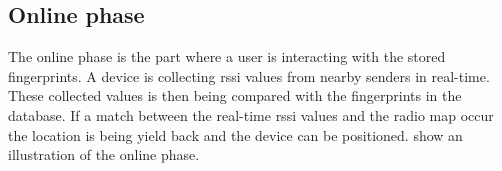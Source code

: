

\subsection{Online phase}\label{sec:theoryFingerprintOnline} The online phase
is the part where a user is interacting with the stored fingerprints.
A device is collecting \acrshort{rssi} values from nearby senders in real-time.
These collected values is then being compared with the fingerprints in the database.
If a match between the real-time \acrshort{rssi} values and the radio map occur the location is being yield back and the device can be positioned.
 show an illustration of the
online phase.
\cite{IndoorFingerprintPositioning2017}


